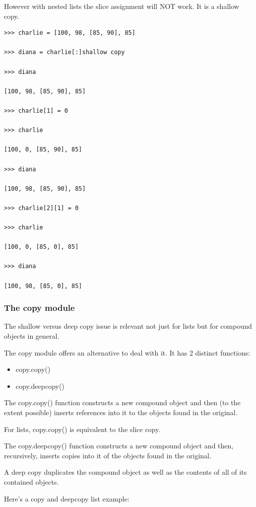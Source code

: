 \documentclass{article}
\begin{document}
However with nested lists the slice assignment will NOT work.  It is a shallow copy.

\begin{lstlisting}
>>> charlie = [100, 98, [85, 90], 85]

>>> diana = charlie[:]shallow copy

>>> diana

[100, 98, [85, 90], 85]

>>> charlie[1] = 0

>>> charlie

[100, 0, [85, 90], 85]

>>> diana

[100, 98, [85, 90], 85]

>>> charlie[2][1] = 0

>>> charlie

[100, 0, [85, 0], 85]

>>> diana

[100, 98, [85, 0], 85]
\end{lstlisting}

\subsubsection{The copy module}
The shallow versus deep copy issue is relevant not just for lists but for compound objects in general.

The copy module offers an alternative to deal with it.  It has 2 distinct functions:

\begin{itemize}
\item copy.copy()

\item copy.deepcopy()
\end{itemize}

The copy.copy() function  constructs a new compound object and then (to the extent possible) inserts references into it to the objects found in the original.

For lists, copy.copy() is equivalent to the slice copy.

The copy.deepcopy() function constructs a new compound object and then, recursively, inserts copies into it of the objects found in the original.

A deep copy duplicates the compound object as well as the contents of all of its contained objects.

Here's a copy and deepcopy list example:
\end{document}
